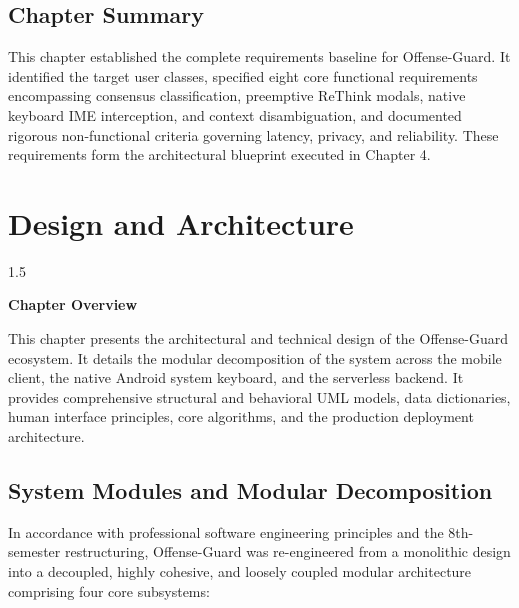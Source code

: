 \documentclass[A4paper,12pt]{report}
\theoremstyle{plain}
\theoremstyle{definition}
\theoremstyle{remark}
\numberwithin{equation}{section}
\begin{document}
\section{Chapter Summary}
This chapter established the complete requirements baseline for Offense-Guard. It identified the target user classes, specified eight core functional requirements encompassing consensus classification, preemptive ReThink modals, native keyboard IME interception, and context disambiguation, and documented rigorous non-functional criteria governing latency, privacy, and reliability. These requirements form the architectural blueprint executed in Chapter 4.

\chapter{Design and Architecture}
\thispagestyle{empty}
\newpage
\begin{spacing}{1.5}

\thispagestyle{empty}

{\centering \Large \bfseries Chapter Overview \par}
\vspace{1cm}

This chapter presents the architectural and technical design of the Offense-Guard ecosystem. It details the modular decomposition of the system across the mobile client, the native Android system keyboard, and the serverless backend. It provides comprehensive structural and behavioral UML models, data dictionaries, human interface principles, core algorithms, and the production deployment architecture.

\end{spacing}

\section{System Modules and Modular Decomposition}
In accordance with professional software engineering principles and the 8th-semester restructuring, Offense-Guard was re-engineered from a monolithic design into a decoupled, highly cohesive, and loosely coupled modular architecture comprising four core subsystems:
\end{document}
